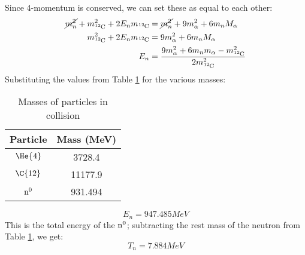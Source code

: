 \documentclass{hw}
\begin{document}
	Since 4-momentum is conserved, we can set these as equal to each other:
	\begin{align*}
		\cancel{m_n^2} + m_{\ce{^{12}C}}^2 + 2 E_n m_{\ce{^{12}C}} &= \cancel{m_n^2} + 9m_{\alpha}^2 + 6m_n M_{\alpha} \\
		m_{\ce{^{12}C}}^2 + 2 E_n m_{\ce{^{12}C}} &= 9m_{\alpha}^2 + 6m_n M_{\alpha} \\
		E_n &= \frac{9 m_{\alpha}^2 + 6 m_n m_{\alpha} - m_{\ce{^{12}C}}^2}{2 m_{\ce{^{12}C}}^2}
	\end{align*}
	Substituting the values from Table \ref{table:particlemasses} for the various masses:
	\begin{center}
		\begin{table}[h]
			\centering
				\begin{tabular}{ |c|c| }
					\hline
					Particle & Mass (MeV) \\
					\hline
					$ \He{4} $  & 3728.4 \\
					$ \C{12} $  & 11177.9 \\
					$ \mathrm{n^0} $ & 931.494 \\
					\hline
				\end{tabular}
				\caption{Masses of particles in collision\label{table:particlemasses}}
		\end{table}
	\end{center}
	\[ E_n = 947.485 MeV \]
	This is the total energy of the $ \mathrm{n^0} $; subtracting the rest mass of the neutron from Table \ref{table:particlemasses}, we get:
	\[ T_n = 7.884 MeV \]
\end{document}
